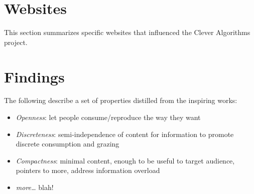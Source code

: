 \documentclass[a4paper, 11pt]{article}
\begin{document}
\section{Websites}
\label{sec:websites}
This section summarizes specific websites that influenced the Clever Algorithms project.


\section{Findings}
\label{sec:findings}

The following describe a set of properties distilled from the inspiring works:

\begin{itemize}
	\item \emph{Openness}: let people consume/reproduce the way they want
	\item \emph{Discreteness}: semi-independence of content for information to promote discrete consumption and grazing
	\item \emph{Compactness}: minimal content, enough to be useful to target audience, pointers to more, address information overload 
	\item \emph{more\ldots} blah!
\end{itemize}





\end{document}

